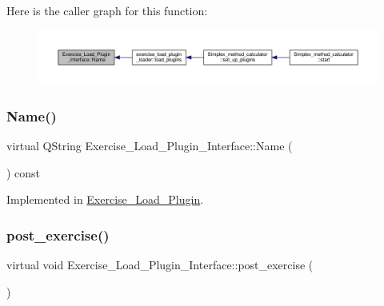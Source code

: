 Here is the caller graph for this function\+:\nopagebreak
\begin{figure}[H]
\begin{center}
\leavevmode
\includegraphics[width=350pt]{classExercise__Load__Plugin__Interface_ab6899b947c3890e73b8a64b3c76c60de_icgraph}
\end{center}
\end{figure}
\mbox{\label{classExercise__Load__Plugin__Interface_ab6899b947c3890e73b8a64b3c76c60de}} 
\subsubsection{\texorpdfstring{Name()}{Name()}\hspace{0.1cm}{\footnotesize\ttfamily [2/2]}}
{\footnotesize\ttfamily virtual Q\+String Exercise\+\_\+\+Load\+\_\+\+Plugin\+\_\+\+Interface\+::\+Name (\begin{DoxyParamCaption}{ }\end{DoxyParamCaption}) const\hspace{0.3cm}{\ttfamily [pure virtual]}}



Implemented in \hyperlink{classExercise__Load__Plugin_af6226d33bef2f1f526a8f37ec33e431c}{Exercise\+\_\+\+Load\+\_\+\+Plugin}.

\mbox{\label{classExercise__Load__Plugin__Interface_abb9fef00080e48c6ce458b7476db97d9}} 
\subsubsection{\texorpdfstring{post\+\_\+exercise()}{post\_exercise()}\hspace{0.1cm}{\footnotesize\ttfamily [1/2]}}
{\footnotesize\ttfamily virtual void Exercise\+\_\+\+Load\+\_\+\+Plugin\+\_\+\+Interface\+::post\+\_\+exercise (\begin{DoxyParamCaption}\item[{Q\+Standard\+Item\+Model $\ast$}]{ }\end{DoxyParamCaption})\hspace{0.3cm}{\ttfamily [pure virtual]}}



